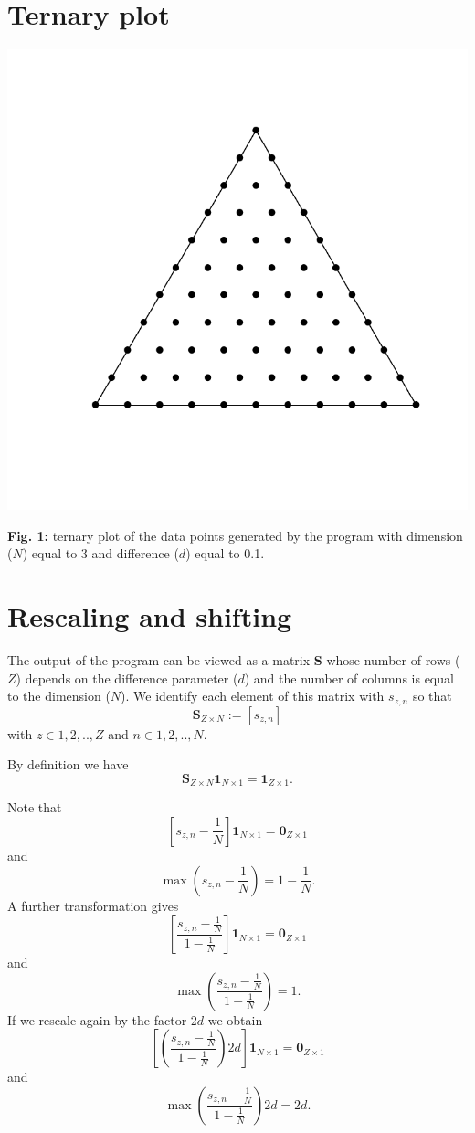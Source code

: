 \documentclass[12pt,a4paper]{article}
\begin{document}
\section*{Ternary plot}
\centerline{\includegraphics[scale=0.5]{fig1.pdf}}
\vspace{-1cm}
\textbf{Fig. 1:} ternary plot of the data points generated by the program with dimension ($N$) equal to 3 and difference ($d$) equal to 0.1.

\section*{Rescaling and shifting}
The output of the program can be viewed as a matrix $\textbf{S}$ whose number of rows ($Z$) depends on the difference parameter ($d$) and the number of columns is equal to the dimension ($N$). 
We identify each element of this matrix with $s_{z,n}$ so that 
\[
\textbf{S}_{Z\times N}:=[s_{z,n}]
\]
with $z \in {1,2,..,Z}$ and $n \in {1,2,..,N}$.

By definition we have
\[
\textbf{S}_{Z\times N}\textbf{1}_{N\times 1}=\textbf{1}_{Z\times 1}.
\]

Note that
\[
\left[s_{z,n}-\frac{1}{N}\right]\textbf{1}_{N\times 1}=\textbf{0}_{Z\times 1}
\]
and
\[
\max \left(s_{z,n}-\frac{1}{N}\right)=1-\frac{1}{N}.
\]
A further transformation gives 
\[
\left[\frac{s_{z,n}-\frac{1}{N}}{1-\frac{1}{N}}\right]\textbf{1}_{N\times 1}=\textbf{0}_{Z\times 1}
\]
and
\[
\max \left(\frac{s_{z,n}-\frac{1}{N}}{1-\frac{1}{N}}\right)=1.
\]
If we rescale again by the factor $2d$ we obtain
\[
\left[\left(\frac{s_{z,n}-\frac{1}{N}}{1-\frac{1}{N}}\right)2d\right]\textbf{1}_{N\times 1}=\textbf{0}_{Z\times 1}
\]
and
\[
\max \left(\frac{s_{z,n}-\frac{1}{N}}{1-\frac{1}{N}}\right)2d=2d.
\]
\end{document}
